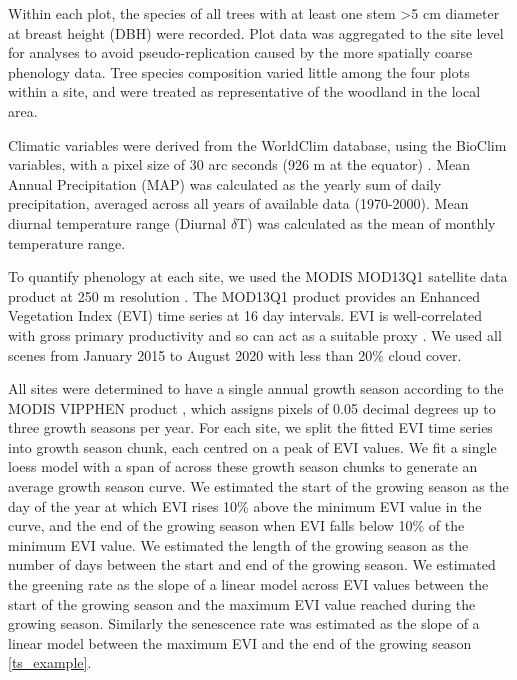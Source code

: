 \documentclass[11pt,a4paper]{article}
\begin{document}
Within each plot, the species of all trees with at least one stem >5 cm diameter at breast height (DBH) were recorded. Plot data was aggregated to the site level for analyses to avoid pseudo-replication caused by the more spatially coarse phenology data. Tree species composition varied little among the four plots within a site, and were treated as representative of the woodland in the local area.

Climatic variables were derived from the WorldClim database, using the BioClim variables, with a pixel size of 30 arc seconds (926 m at the equator) \citep{Fick2017}. Mean Annual Precipitation (MAP) was calculated as the yearly sum of daily precipitation, averaged across all years of available data (1970-2000). Mean diurnal temperature range (Diurnal $\delta$T) was calculated as the mean of monthly temperature range. 

To quantify phenology at each site, we used the MODIS MOD13Q1 satellite data product at 250 m resolution \citep{}. The MOD13Q1 product provides an Enhanced Vegetation Index (EVI) time series at 16 day intervals. EVI is well-correlated with gross primary productivity and so can act as a suitable proxy \citep{}. We used all scenes from January 2015 to August 2020 with less than 20\% cloud cover.

All sites were determined to have a single annual growth season according to the MODIS VIPPHEN product \citep{}, which assigns pixels of 0.05 decimal degrees up to three growth seasons per year. For each site, we split the fitted EVI time series into growth season chunk, each centred on a peak of EVI values. We fit a single loess model with a span of \loessSpan{} across these growth season chunks to generate an average growth season curve. We estimated the start of the growing season as the day of the year at which EVI rises 10\% above the minimum EVI value in the curve, and the end of the growing season when EVI falls below 10\% of the minimum EVI value. We estimated the length of the growing season as the number of days between the start and end of the growing season. We estimated the greening rate as the slope of a linear model across EVI values between the start of the growing season and the maximum EVI value reached during the growing season. Similarly the senescence rate was estimated as the slope of a linear model between the maximum EVI and the end of the growing season \autoref{ts_example}.
\end{document}
